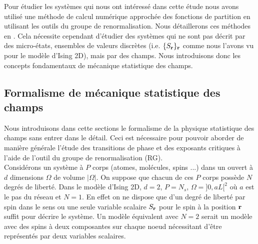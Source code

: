 \documentclass[10.5pt]{article}
\begin{document}
\begin{multicols*}{2}
Pour étudier les systèmes qui nous ont intéressé dans cette étude nous avons utilisé une méthode de calcul numérique approchée des fonctions de partition en utilisant les outils du groupe de renormalisation. Nous détaillerons ces méthodes en . Cela nécessite cependant d'étudier des systèmes qui ne sont pas décrit par des micro-états, ensembles de valeurs discrètes (i.e. $\{S_{\bf r}\}_{\bf r}$ comme nous l'avons vu pour le modèle d'Ising 2D), mais par des champs. Nous introduisons donc les concepts fondamentaux de mécanique statistique des champs. \\




\subsection{Formalisme de mécanique statistique des champs}

\label{sec:Origin}

Nous introduisons dans cette sections le formalisme de la physique statistique \cite{diu2007thermodynamique} des champs sans entrer dans le détail. Ceci est nécessaire pour pouvoir aborder de manière générale l'étude des transitions de phase et des exposants critiques à l'aide de l'outil du groupe de renormalisation (RG). \\

Considérons un système à $P$ corps (atomes, molécules, spins  ...) dans un ouvert à $d$ dimensions $\Omega$ de volume $|\Omega|$. On suppose que chacun de ces $P$ corps possède $N$ degrés de liberté. Dans le modèle d'Ising 2D, $d=2$, $P=N_s$, $\Omega = ]0, aL[^2$ où $a$ est le pas du réseau et $N=1$. En effet on ne dispose que d'un degré de liberté par spin dans le sens ou une seule variable scalaire $S_{\bf r}$ pour le spin à la position ${\bf r}$ suffit pour décrire le système. Un modèle équivalent avec $N=2$ serait un modèle avec des spins à deux composantes sur chaque noeud nécessitant d'être représentés par deux variables scalaires. \\


\end{multicols*}
\end{document}
